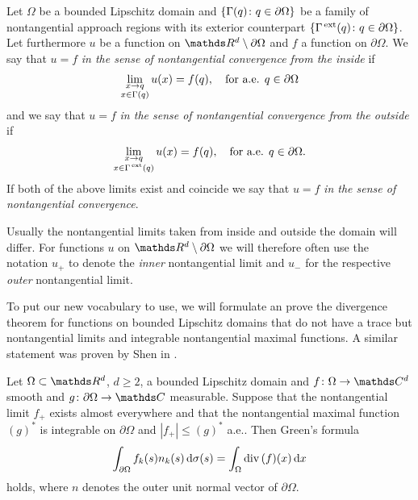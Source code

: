 \begin{defn}
  Let $\Omega$ be a bounded Lipschitz domain and $\{\Gamma(q) \colon q \in \partial\Omega\}$ be a family of nontangential approach regions with its exterior counterpart $\{\Gamma^{\,\mathrm{ext}}(q) \colon q \in \partial\Omega\}$.
  Let furthermore $u$ be a function on $\R^d \setminus \partial\Omega$ and $f$ a function on $\partial\Omega$.
  We say that $u = f$ \emph{in the sense of nontangential convergence from the inside} if 
  \begin{align*}
    \lim_{\substack{ x \to q \\ x \in \Gamma(q)}} u(x) = f(q), \quad\text{for a.e. } q \in \partial\Omega
  \end{align*}
  and we say that $u = f$ \emph{in the sense of nontangential convergence from the outside} if 
  \begin{align*}
    \lim_{\substack{ x \to q \\ x \in \Gamma^{\,\mathrm{ext}}(q)}} u(x) = f(q), \quad\text{for a.e. } q \in \partial\Omega.
  \end{align*}
  If both of the above limits exist and coincide we say that $u = f$ \emph{in the sense of nontangential convergence}.
\end{defn}

Usually the nontangential limits taken from inside and outside the domain will differ.
For functions $u$ on $\R^d \setminus \partial\Omega$ we will therefore often use the notation $u_+$ to denote the \emph{inner} nontangential limit and $u_-$ for the respective \emph{outer} nontangential limit.

To put our new vocabulary to use, we will formulate an prove the divergence theorem for functions on bounded Lipschitz domains that do not have a trace but nontangential limits and integrable nontangential maximal functions. A similar statement was proven by Shen in \cite[Thm.\@~7.1.6]{Shen2017}.

\begin{prop}
  \label{prop:approximationArgument}
  Let $\Omega \subset \R^d$, $d \geq 2$, a bounded Lipschitz domain and $f \colon \Omega \to \C^d$ smooth and $g \colon \partial\Omega \to \C$ measurable.
  Suppose that the nontangential limit $f_+$ exists almost everywhere and that the nontangential maximal function $(g)^*$ is integrable on $\partial\Omega$ and $|f_+| \leq (g)^*$ a.e..
  Then Green's formula
  \begin{align}
    \int_{\partial\Omega} f_k(s) n_k(s) \, {\operatorname{d}\!{\sigma}}(s) = \int_\Omega \mathrm{div\,} (f)(x) \, {\operatorname{d}\!{x}}
  \end{align}
  holds, where $n$ denotes the outer unit normal vector of $\partial\Omega$.
\end{prop}

